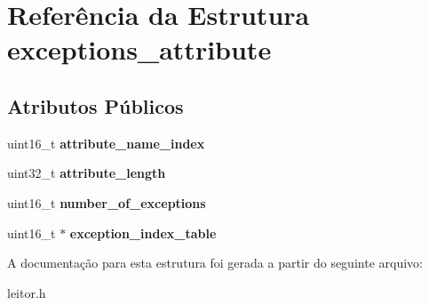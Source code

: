 \hypertarget{structexceptions__attribute}{\section{Referência da Estrutura exceptions\-\_\-attribute}
\label{structexceptions__attribute}
}
\subsection*{Atributos Públicos}
\begin{DoxyCompactItemize}
\item 
\hypertarget{structexceptions__attribute_ab437e79be045de2cf098cee0fb32904a}{uint16\-\_\-t {\bfseries attribute\-\_\-name\-\_\-index}}\label{structexceptions__attribute_ab437e79be045de2cf098cee0fb32904a}

\item 
\hypertarget{structexceptions__attribute_aefa89cadaeaf2992b531ce296f1b9f6b}{uint32\-\_\-t {\bfseries attribute\-\_\-length}}\label{structexceptions__attribute_aefa89cadaeaf2992b531ce296f1b9f6b}

\item 
\hypertarget{structexceptions__attribute_a651abd570461b65e8eafbca9c7c964d8}{uint16\-\_\-t {\bfseries number\-\_\-of\-\_\-exceptions}}\label{structexceptions__attribute_a651abd570461b65e8eafbca9c7c964d8}

\item 
\hypertarget{structexceptions__attribute_a212dfa4d74f4e8628a8777232a74b1a6}{uint16\-\_\-t $\ast$ {\bfseries exception\-\_\-index\-\_\-table}}\label{structexceptions__attribute_a212dfa4d74f4e8628a8777232a74b1a6}

\end{DoxyCompactItemize}


A documentação para esta estrutura foi gerada a partir do seguinte arquivo\-:\begin{DoxyCompactItemize}
\item 
leitor.\-h\end{DoxyCompactItemize}
